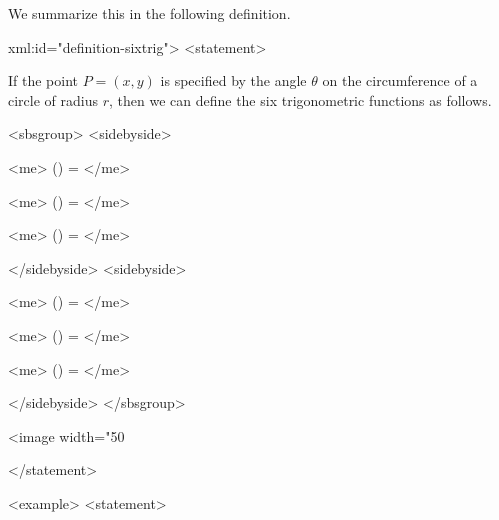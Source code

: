         We summarize this in the following definition.
      
      \begin{myDefinition}  xml:id="definition-sixtrig">
        <statement>
          
            If the point $ P = \left(x,y \right)$ is specified by the angle $\theta$ on the circumference of a circle of radius $r$, then we can define the six trigonometric functions as follows.
          
          <sbsgroup>
            <sidebyside>
              
                <me> \cos (\theta ) =  </me>
              
              
                <me> \sin (\theta ) =  </me>
              
              
                <me> \tan (\theta ) =  </me>
              
            </sidebyside>
            <sidebyside>
              
                <me> \sec (\theta ) =  </me>
              
              
                <me> \csc (\theta ) =  </me>
              
              
                <me> \cot (\theta ) =  </me>
              
            </sidebyside>
          </sbsgroup>
          \begin{center}
     \label{fig:nonunitcirclexyallsix}
            \captionsetup{type=figure} 
            <image width="50%
              
              
            
          \end{center}
        </statement>
      \end{myDefinition}
      <example>
        <statement>
          
